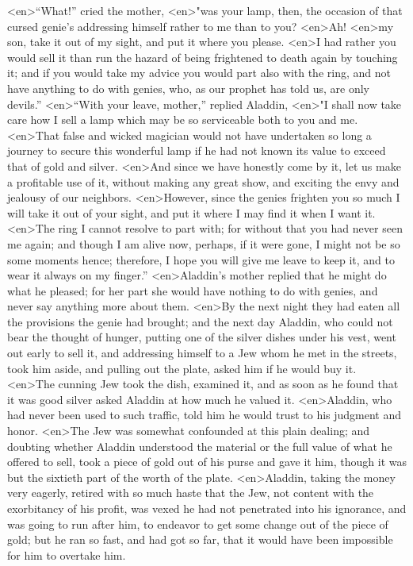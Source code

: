 <en>“What!” cried the mother,
<en>"was your lamp, then, the occasion of that cursed genie’s addressing himself rather to me than to you?
<en>Ah!
<en>my son, take it out of my sight, and put it where you please.
<en>I had rather you would sell it than run the hazard of being frightened to death again by touching it; and if you would take my advice you would part also with the ring, and not have anything to do with genies, who, as our prophet has told us, are only devils.”
<en>“With your leave, mother,” replied Aladdin,
<en>"I shall now take care how I sell a lamp which may be so serviceable both to you and me.
<en>That false and wicked magician would not have undertaken so long a journey to secure this wonderful lamp if he had not known its value to exceed that of gold and silver.
<en>And since we have honestly come by it, let us make a profitable use of it, without making any great show, and exciting the envy and jealousy of our neighbors.
<en>However, since the genies frighten you so much I will take it out of your sight, and put it where I may find it when I want it.
<en>The ring I cannot resolve to part with; for without that you had never seen me again; and though I am alive now, perhaps, if it were gone, I might not be so some moments hence; therefore, I hope you will give me leave to keep it, and to wear it always on my finger.”
<en>Aladdin’s mother replied that he might do what he pleased; for her part she would have nothing to do with genies, and never say anything more about them.
<en>By the next night they had eaten all the provisions the genie had brought; and the next day Aladdin, who could not bear the thought of hunger, putting one of the silver dishes under his vest, went out early to sell it, and addressing himself to a Jew whom he met in the streets, took him aside, and pulling out the plate, asked him if he would buy it.
<en>The cunning Jew took the dish, examined it, and as soon as he found that it was good silver asked Aladdin at how much he valued it.
<en>Aladdin, who had never been used to such traffic, told him he would trust to his judgment and honor.
<en>The Jew was somewhat confounded at this plain dealing; and doubting whether Aladdin understood the material or the full value of what he offered to sell, took a piece of gold out of his purse and gave it him, though it was but the sixtieth part of the worth of the plate.
<en>Aladdin, taking the money very eagerly, retired with so much haste that the Jew, not content with the exorbitancy of his profit, was vexed he had not penetrated into his ignorance, and was going to run after him, to endeavor to get some change out of the piece of gold; but he ran so fast, and had got so far, that it would have been impossible for him to overtake him.
